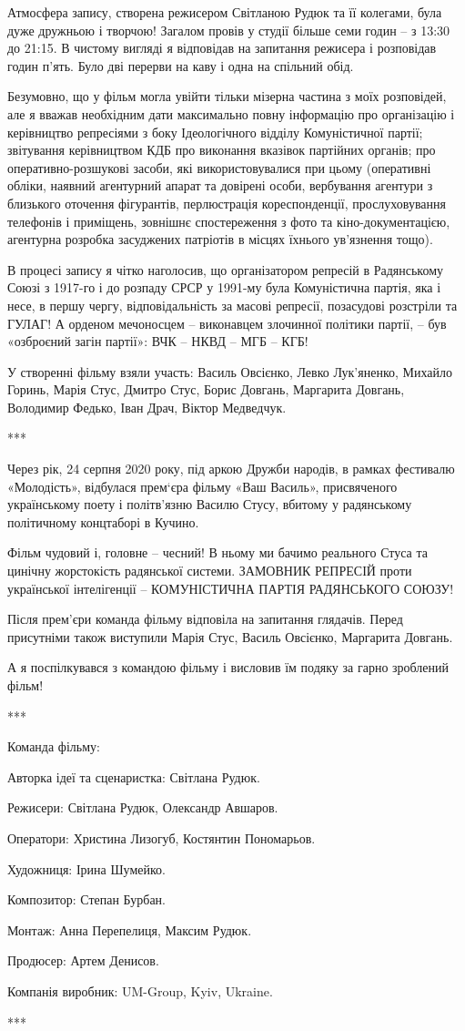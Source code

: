 Атмосфера запису, створена режисером Світланою Рудюк та її колегами, була дуже
дружньою і творчою! Загалом провів у студії більше семи годин – з 13:30 до
21:15. В чистому вигляді я відповідав на запитання режисера і розповідав годин
п’ять. Було дві перерви на каву і одна на спільний обід.

Безумовно, що у фільм могла увійти тільки мізерна частина з моїх розповідей,
але я вважав необхідним дати максимально повну інформацію про організацію і
керівництво репресіями з боку Ідеологічного відділу Комуністичної партії;
звітування керівництвом КДБ про виконання вказівок партійних органів; про
оперативно-розшукові засоби, які використовувалися при цьому (оперативні
обліки, наявний агентурний апарат та довірені особи, вербування агентури з
близького оточення фігурантів, перлюстрація кореспонденції, прослуховування
телефонів і приміщень, зовнішнє спостереження з фото та  кіно-документацією,
агентурна розробка засуджених патріотів в місцях їхнього ув’язнення тощо). 

В процесі запису я чітко наголосив, що організатором репресій в Радянському
Союзі з 1917-го і до розпаду СРСР у 1991-му була Комуністична партія, яка і
несе, в першу чергу, відповідальність за масові репресії, позасудові розстріли
та ГУЛАГ! А  орденом мечоносцем –  виконавцем злочинної політики партії, – був
«озброєний загін партії»: ВЧК – НКВД – МГБ – КГБ!

У створенні фільму взяли участь: Василь Овсієнко, Левко Лук’яненко, Михайло
Горинь, Марія Стус, Дмитро Стус, Борис Довгань, Маргарита Довгань, Володимир
Федько, Іван Драч, Віктор Медведчук.

***

Через рік, 24 серпня 2020 року, під аркою Дружби народів, в рамках фестивалю
«Молодість», відбулася прем‘єра фільму «Ваш Василь», присвяченого українському
поету і політв’язню Василю Стусу, вбитому у радянському політичному концтаборі
в Кучино. 

Фільм чудовий і, головне – чесний! В ньому ми бачимо реального Стуса та цинічну
жорстокість радянської системи. ЗАМОВНИК РЕПРЕСІЙ проти української
інтелігенції – КОМУНІСТИЧНА ПАРТІЯ РАДЯНСЬКОГО СОЮЗУ!

Після прем’єри команда фільму відповіла на запитання глядачів. Перед присутніми
також виступили Марія Стус, Василь Овсієнко, Маргарита Довгань.

А я поспілкувався з командою фільму і висловив їм подяку за гарно зроблений
фільм! 

***

Команда фільму:

Авторка ідеї та сценаристка: Світлана Рудюк.

Режисери: Світлана Рудюк, Олександр Авшаров.

Оператори: Христина Лизогуб, Костянтин Пономарьов.

Художниця: Ірина Шумейко.

Композитор: Степан Бурбан.

Монтаж: Анна Перепелиця, Максим Рудюк.

Продюсер: Артем Денисов.

Компанія виробник: UM-Group, Kyiv, Ukraine.

***
